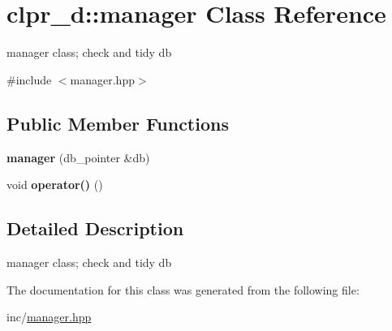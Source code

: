 \hypertarget{classclpr__d_1_1manager}{\section{clpr\-\_\-d\-:\-:manager \-Class \-Reference}
\label{classclpr__d_1_1manager}
}


manager class; check and tidy db  




{\ttfamily \#include $<$manager.\-hpp$>$}

\subsection*{\-Public \-Member \-Functions}
\begin{DoxyCompactItemize}
\item 
\hypertarget{classclpr__d_1_1manager_a6d882d60efa8b71d7bebb6fa339a5046}{{\bfseries manager} (db\-\_\-pointer \&db)}\label{classclpr__d_1_1manager_a6d882d60efa8b71d7bebb6fa339a5046}

\item 
\hypertarget{classclpr__d_1_1manager_a1913d3dc47bb79d56957be61770f359e}{void {\bfseries operator()} ()}\label{classclpr__d_1_1manager_a1913d3dc47bb79d56957be61770f359e}

\end{DoxyCompactItemize}


\subsection{\-Detailed \-Description}
manager class; check and tidy db 

\-The documentation for this class was generated from the following file\-:\begin{DoxyCompactItemize}
\item 
inc/\hyperlink{manager_8hpp}{manager.\-hpp}\end{DoxyCompactItemize}
